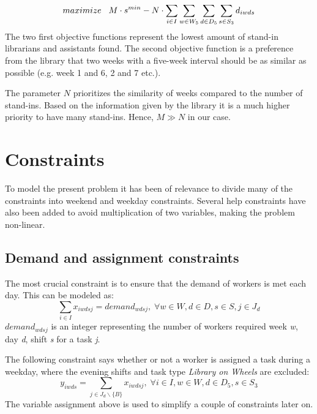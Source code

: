 \begin{equation} \label{objfcn}
maximize \hspace{0.3cm} M\cdot s^{min} - N \cdot \sum_{i \in I}\sum_{w \in W_5}\sum_{d \in D_5}\sum_{s \in S_3} d_{iwds}
\end{equation}
The two first objective functions represent the lowest amount of stand-in librarians and assistants found. The second objective function is a preference from the library that two weeks with a five-week interval should be as similar as possible (e.g. week 1 and 6, 2 and 7 etc.).

The parameter $N$ prioritizes the similarity of weeks compared to the number of stand-ins. Based on the information given by the library it is a much higher priority to have many stand-ins. Hence, $M \gg N$ in our case.




\section{Constraints} \label{constraints}
To model the present problem it has been of relevance to divide many of the constraints into weekend and weekday constraints. Several help constraints have also been added to avoid multiplication of two variables, making the problem non-linear.

\subsection{Demand and assignment constraints} \label{section:demand_ass_constraints}
The most crucial constraint is to ensure that the demand of workers is met each day. This can be modeled as:
\begin{equation} \label{eq:demand}
\sum_{i \in I} x_{iwdsj} = demand_{wdsj}, \; \forall w\in W,d\in D,s\in S,j\in J_d
\end{equation}
$demand_{wdsj}$ is an integer representing the number of workers required week \textit{w}, day \textit{d}, shift \textit{s} for a task \textit{j}.

The following constraint says whether or not a worker is assigned a task during a weekday, where the evening shifts and task type \textit{Library on Wheels} are excluded:
\begin{equation} \label{constr:y_assign}
y_{iwds} = \sum_{j \in J_d\backslash \{B\}} x_{iwdsj}, \; \forall i \in I, w \in W, d \in D_5, s \in S_3
\end{equation}
The variable assignment above is used to simplify a couple of constraints later on.

